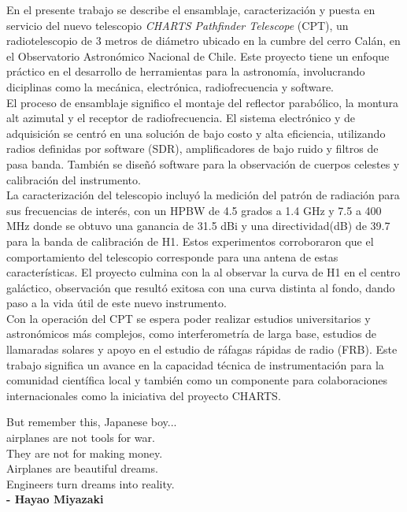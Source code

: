 \documentclass[
	spanish, %
	letterpaper, oneside
]{book}
\begin{document}
\templatePortrait

\templatePagecfg

\begin{abstractd}
	En el presente trabajo se describe el ensamblaje, caracterización y puesta en servicio del nuevo telescopio \textit{CHARTS Pathfinder Telescope} (CPT), un radiotelescopio de 3 metros de diámetro ubicado en la cumbre del cerro Calán, en el Observatorio Astronómico Nacional de Chile. Este proyecto tiene un enfoque práctico en el desarrollo de herramientas para la astronomía, involucrando diciplinas como la mecánica, electrónica, radiofrecuencia y software.\\
	
	El proceso de ensamblaje significo el montaje del reflector parabólico, la montura alt azimutal y el receptor de radiofrecuencia. El sistema electrónico y de adquisición se centró en una solución de bajo costo y alta eficiencia, utilizando radios definidas por software (SDR), amplificadores de bajo ruido y filtros de pasa banda. También se diseñó software para la observación de cuerpos celestes y calibración del instrumento.\\

	La caracterización del telescopio incluyó la medición del patrón de radiación para sus frecuencias de interés, con un HPBW de 4.5 grados a 1.4 GHz y 7.5 a 400 MHz donde se obtuvo una ganancia de 31.5 dBi y una directividad(dB) de 39.7 para la banda de calibración de H1. Estos experimentos corroboraron que el comportamiento del telescopio corresponde para una antena de estas características. El proyecto culmina con la  al observar la curva de H1 en el centro galáctico, observación que resultó exitosa con una curva distinta al fondo, dando paso a la vida útil de este nuevo instrumento.\\

	Con la operación del CPT se espera poder realizar estudios universitarios y astronómicos más complejos, como interferometría de larga base, estudios de llamaradas solares y apoyo  en el estudio de ráfagas rápidas de radio (FRB). Este trabajo significa un avance en la capacidad técnica de instrumentación para la comunidad científica local y también como un componente para colaboraciones internacionales como la iniciativa del proyecto CHARTS. \\
\end{abstractd}

\begin{dedicatory}
	But remember this, Japanese boy...\\
	airplanes are not tools for war.\\
	They are not for making money.\\ 
	Airplanes are beautiful dreams. \\
	Engineers turn dreams into reality.\\

	\textbf{- Hayao Miyazaki}
\end{dedicatory}
\end{document}
